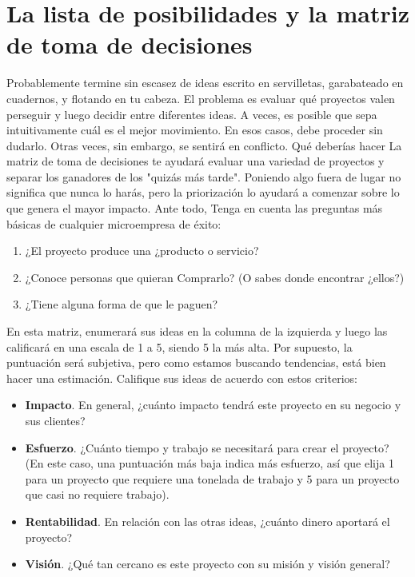\documentclass[10pt]{book}
\begin{document}
	\section{La lista de posibilidades y la matriz de toma de decisiones}
	Probablemente termine sin escasez de ideas escrito en servilletas, garabateado en cuadernos, y flotando en tu cabeza. El problema es evaluar qué proyectos valen perseguir y luego decidir entre diferentes ideas. A veces, es posible que sepa intuitivamente cuál es el mejor movimiento. En esos casos, debe proceder sin dudarlo. Otras veces, sin embargo, se sentirá en conflicto. Qué
deberías hacer La matriz de toma de decisiones te ayudará evaluar una variedad de proyectos y separar los ganadores de los "quizás más tarde". Poniendo algo fuera de lugar no significa que nunca lo harás, pero la priorización lo ayudará a comenzar sobre lo que genera el mayor impacto. Ante todo, Tenga en cuenta las preguntas más básicas de cualquier microempresa de éxito:
	\begin{enumerate}[\bfseries 1.]
	    \item ¿El proyecto produce una ¿producto o servicio?
	    \item ¿Conoce personas que quieran Comprarlo? (O sabes donde encontrar ¿ellos?)
	    \item ¿Tiene alguna forma de que le paguen?
	\end{enumerate}
	En esta matriz, enumerará sus ideas en la columna de la izquierda y luego las calificará en una escala de 1 a 5, siendo 5 la más alta. Por supuesto, la puntuación será subjetiva, pero como estamos buscando tendencias, está bien hacer una estimación. Califique sus ideas de acuerdo con estos criterios:
	\begin{itemize}
	    \item \textbf{Impacto}. En general, ¿cuánto impacto tendrá este proyecto en su negocio y sus clientes?
	    \item \textbf{Esfuerzo}. ¿Cuánto tiempo y trabajo se necesitará para crear el proyecto? (En este caso, una puntuación más baja indica más esfuerzo, así que elija 1 para un proyecto que requiere una tonelada de trabajo y 5 para un proyecto que casi no requiere trabajo).
	    \item \textbf{Rentabilidad}. En relación con las otras ideas, ¿cuánto dinero aportará el proyecto?
	    \item \textbf{Visión}. ¿Qué tan cercano es este proyecto con su misión y visión general?
	\end{itemize}
\end{document}
